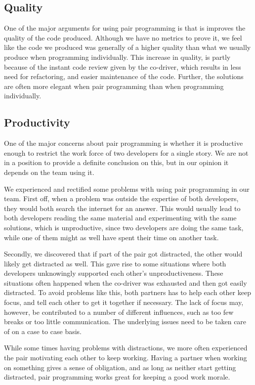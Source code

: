 \subsection{Quality}
One of the major arguments for using pair programming is that is improves the quality of the code produced.
Although we have no metrics to prove it, we feel like the code we produced was generally of a higher quality than what we usually produce when programming individually.
This increase in quality, is partly because of the instant code review given by the co-driver, which results in less need for refactoring, and easier maintenance of the code.
Further, the solutions are often more elegant when pair programming than when programming individually.

\subsection{Productivity}
One of the major concerns about pair programming is whether it is productive enough to restrict the work force of two developers for a single story.
We are not in a position to provide a definite conclusion on this, but in our opinion it depends on the team using it.

We experienced and rectified some problems with using pair programming in our team.
First off, when a problem was outside the expertise of both developers, they would both search the internet for an answer.
This would usually lead to both developers reading the same material and experimenting with the same solutions, which is unproductive, since two developers are doing the same task, while one of them might as well have spent their time on another task.

Secondly, we discovered that if part of the pair got distracted, the other would likely get distracted as well.
This gave rise to some situations where both developers unknowingly supported each other's unproductiveness.
These situations often happened when the co-driver was exhausted and then got easily distracted.
To avoid problems like this, both partners has to help each other keep focus, and tell each other to get it together if necessary.
The lack of focus may, however, be contributed to a number of different influences, such as too few breaks or too little communication.
The underlying issues need to be taken care of on a case to case basis.

While some times having problems with distractions, we more often experienced the pair motivating each other to keep working.
Having a partner when working on something gives a sense of obligation, and as long as neither start getting distracted, pair programming works great for keeping a good work morale.

